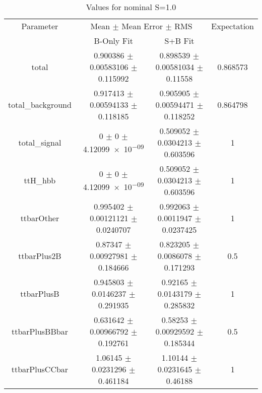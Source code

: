 \begin{table}
\centering
\caption{Values for nominal S=1.0}
\begin{tabular}{cccc}
\toprule
Parameter & \multicolumn{2}{c}{Mean $\pm$ Mean Error $\pm$ RMS} & Expectation\\
 & B-Only Fit & S+B Fit & \\
\midrule
total & \num{0.900386} $\pm$ \num{0.00583106} $\pm$ \num{0.115992} & \num{0.898539} $\pm$ \num{0.00581034} $\pm$ \num{0.11558} & \num{0.868573}\\
total\_background & \num{0.917413} $\pm$ \num{0.00594133} $\pm$ \num{0.118185} & \num{0.905905} $\pm$ \num{0.00594471} $\pm$ \num{0.118252} & \num{0.864798}\\
total\_signal & \num{0} $\pm$ \num{0} $\pm$ \num{4.12099e-09} & \num{0.509052} $\pm$ \num{0.0304213} $\pm$ \num{0.603596} & \num{1}\\
ttH\_hbb & \num{0} $\pm$ \num{0} $\pm$ \num{4.12099e-09} & \num{0.509052} $\pm$ \num{0.0304213} $\pm$ \num{0.603596} & \num{1}\\
ttbarOther & \num{0.995402} $\pm$ \num{0.00121121} $\pm$ \num{0.0240707} & \num{0.992063} $\pm$ \num{0.0011947} $\pm$ \num{0.0237425} & \num{1}\\
ttbarPlus2B & \num{0.87347} $\pm$ \num{0.00927981} $\pm$ \num{0.184666} & \num{0.823205} $\pm$ \num{0.0086078} $\pm$ \num{0.171293} & \num{0.5}\\
ttbarPlusB & \num{0.945803} $\pm$ \num{0.0146237} $\pm$ \num{0.291935} & \num{0.92165} $\pm$ \num{0.0143179} $\pm$ \num{0.285832} & \num{1}\\
ttbarPlusBBbar & \num{0.631642} $\pm$ \num{0.00966792} $\pm$ \num{0.192761} & \num{0.58253} $\pm$ \num{0.00929592} $\pm$ \num{0.185344} & \num{0.5}\\
ttbarPlusCCbar & \num{1.06145} $\pm$ \num{0.0231296} $\pm$ \num{0.461184} & \num{1.10144} $\pm$ \num{0.0231645} $\pm$ \num{0.46188} & \num{1}\\
\bottomrule
\end{tabular}
\end{table}